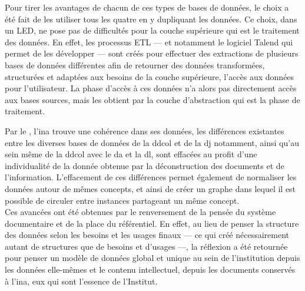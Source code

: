 Pour tirer les avantages de chacun de ces types de bases de données, le choix a été fait de les utiliser tous les quatre en y dupliquant les données. Ce choix, dans un LED, ne pose pas de difficultés pour la couche supérieure qui est le traitement des données. En effet, les processus ETL --- et notamment le logiciel Talend qui permet de les développer --- sont créés pour effectuer des extractions de plusieurs bases de données différentes afin de retourner des données transformées, structurées et adaptées aux besoins de la couche supérieure, l'accès aux données pour l'utilisateur. La phase d'accès à ces données n'a alors pas directement accès aux bases sources, mais les obtient par la couche d'abstraction qui est la phase de traitement.

Par le \ldd, l'\ac{ina} trouve une cohérence dans ses données, les différences existantes entre les diverses bases de données de la \ac{ddcol} et de la \ac{dj} notamment, ainsi qu'au sein même de la \ac{ddcol} avec le \ac{da} et la \ac{dl}, sont effacées au profit d'une individualité de la donnée obtenue par la déconstruction des documents et de l'information. L'effacement de ces différences permet également de normaliser les données autour de mêmes concepts, et ainsi de créer un graphe dans lequel il est possible de circuler entre instances partageant un même concept.\\

Ces avancées ont été obtenues par le renversement de la pensée du système documentaire et de la place du référentiel. En effet, au lieu de penser la structure des données selon les besoins et les usages finaux --- ce qui créé nécessairement autant de structures que de besoins et d'usages ---, la réflexion a été retournée pour penser un modèle de données global et unique au sein de l'institution depuis les données elle-mêmes et le contenu intellectuel, depuis les documents conservés à l'\ac{ina}, eux qui sont l'essence de l'Institut.